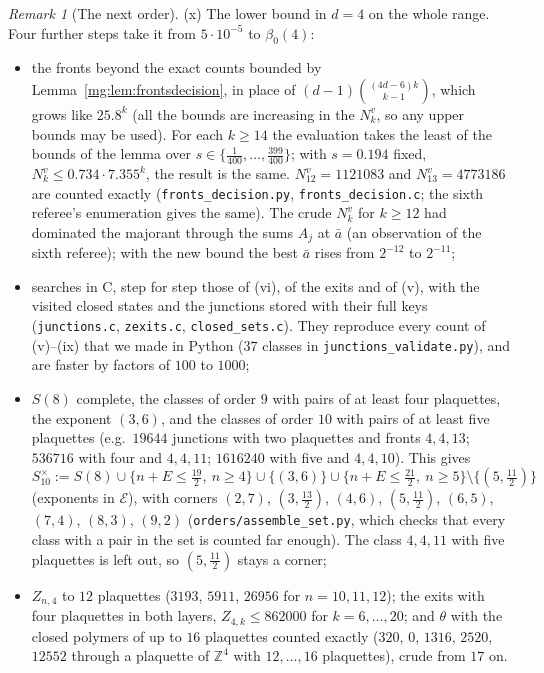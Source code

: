 \documentclass[11pt,a4paper]{article}
\theoremstyle{definition}
\theoremstyle{remark}
\newtheorem{remark}[theorem]{Remark}
\newcommand{\Z}{\mathbb{Z}}
\begin{document}
\begin{remark}[The next order]
(x) The lower bound in $d=4$ on the whole range. Four further steps take it from $5\cdot10^{-5}$ to $\beta_0(4)$:
\begin{itemize}
\item the fronts beyond the exact counts bounded by Lemma~\ref{mg:lem:frontsdecision}, in place of $(d-1)\binom{(4d-6)k}{k-1}$, which grows like $25.8^k$ (all the
bounds are increasing in the $N^v_k$, so any upper bounds may be used). For each $k\ge14$ the evaluation takes the least of the bounds of the lemma over
$s\in\{\frac1{400},\dots,\frac{399}{400}\}$; with $s=0.194$ fixed, $N^v_k\le0.734\cdot7.355^k$, the result is the same. $N^v_{12}=1121083$ and $N^v_{13}=4773186$ are counted exactly (\texttt{fronts\_decision.py},
\texttt{fronts\_decision.c}; the sixth referee's enumeration gives the same). The crude $N^v_k$ for $k\ge12$ had dominated the majorant through the sums $A_j$ at $\bar a$ (an
observation of the sixth referee); with the new bound the best $\bar a$ rises from $2^{-12}$ to $2^{-11}$;
\item searches in C, step for step those of (vi), of the exits and of (v), with the visited closed states and the junctions stored with their full keys (\texttt{junctions.c},
\texttt{zexits.c}, \texttt{closed\_sets.c}). They reproduce every count of (v)--(ix) that we made in Python ($37$ classes in \texttt{junctions\_validate.py}), and are faster by
factors of $100$ to $1000$;
\item $S(8)$ complete, the classes of order $9$ with pairs of at least four plaquettes, the exponent $(3,6)$, and the classes of order $10$ with pairs of at least five
plaquettes (e.g.\ $19644$ junctions with two plaquettes and fronts $4,4,13$; $536716$ with four and $4,4,11$; $1616240$ with five and $4,4,10$). This gives
\[
S^\times_{10}:=S(8)\cup\bigl\{n+E\le\tfrac{19}2,\ n\ge4\bigr\}\cup\{(3,6)\}\cup\bigl\{n+E\le\tfrac{21}2,\ n\ge5\bigr\}\setminus\bigl\{(5,\tfrac{11}2)\bigr\}
\]
(exponents in $\mathcal E$), with corners $(2,7)$, $(3,\frac{13}2)$, $(4,6)$, $(5,\frac{11}2)$, $(6,5)$, $(7,4)$, $(8,3)$, $(9,2)$ (\texttt{orders/assemble\_set.py}, which checks that every class
with a pair in the set is counted far enough). The class $4,4,11$ with five plaquettes is left out, so $(5,\frac{11}2)$ stays a corner;
\item $Z_{n,4}$ to $12$ plaquettes ($3193$, $5911$, $26956$ for $n=10,11,12$); the exits with four plaquettes in both layers, $Z_{4,k}\le862000$ for $k=6,\dots,20$; and $\theta$ with
the closed polymers of up to $16$ plaquettes counted exactly ($320$, $0$, $1316$, $2520$, $12552$ through a plaquette of $\Z^4$ with $12,\dots,16$ plaquettes), crude from $17$ on.

\end{itemize}
\end{remark}
\end{document}
